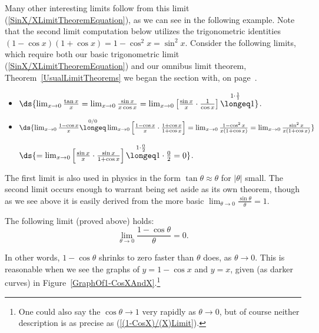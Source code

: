 Many other interesting limits follow from this limit 
(\ref{SinX/XLimitTheoremEquation}), as we can see in the following example.
Note that the second limit computation below utilizes
the trigonometric identities $(1-\cos x)(1+\cos x)=1-\cos^2x=\sin^2x$.
\bex Consider the following limits, which require
both our basic trigonometric limit (\ref{SinX/XLimitTheoremEquation})
and our omnibus limit theorem, Theorem~\ref{UsualLimitTheorems}
we began the section with, on page~\pageref{UsualLimitTheorems}.
\begin{itemize}
\item $\ds{\lim_{x\to0}\frac{\tan x}x=\lim_{x\to0}\frac{\sin x}{x\cos x}
=\lim_{x\to0}\left[\frac{\sin x}{x}\cdot\frac1{\cos x}\right]
\overset{1\cdot\frac11}{\longeq}1}$.
\item $\ds{\lim_{x\to0}\frac{1-\cos x}{x}
\overset{0/0}{\longeq}\lim_{x\to0}\left[\frac{1-\cos x}{x}
 \cdot\frac{1+\cos x}{1+\cos x}\right]
=\lim_{x\to0}\frac{1-\cos^2x}{x(1+\cos x)}
=\lim_{x\to0}\frac{\sin^2x}{x(1+\cos x)}}$

\qquad\qquad
$\ds{=\lim_{x\to0}\left[\frac{\sin x}{x}\cdot\frac{\sin x}{1+\cos x}\right]
\overset{1\cdot\frac02}{\longeq}1\cdot\frac02=0}$.
\end{itemize}
\eex
The first limit is also used in physics in the form
$\tan\theta\approx\theta$ for $|\theta|$ small.
The second limit occurs enough to warrant being set aside as its own
theorem, though as we see above it is easily derived
from the more basic $\lim_{\theta\to0}\frac{\sin\theta}\theta=1$. 
\begin{theorem}The following limit (proved above) holds:
\begin{equation}\lim_{\theta\to0}\frac{1-\cos \theta}{\theta}=0.
\label{(1-CosX)/(X)Limit}\end{equation}
\end{theorem}
In other words, $1-\cos \theta$ shrinks to zero faster than
$\theta$ does, as $\theta\to0$.  This is reasonable when we see the
graphs of $y=1-\cos x$ and $y=x$, given (as darker curves) in
Figure~\ref{GraphOf1-CosXAndX}.\footnote{%
One could also say the $\cos \theta\to 1$ very rapidly as $\theta\to0$,
but of course neither description is as precise as (\ref{(1-CosX)/(X)Limit}).
}

